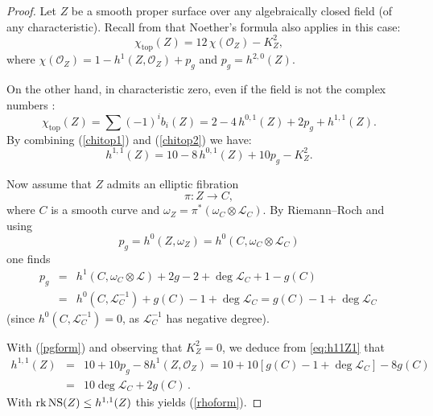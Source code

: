\documentclass[11pt]{amsart}
\theoremstyle{definition}
\theoremstyle{definition}
\theoremstyle{remark}
\theoremstyle{remark}
\theoremstyle{definition}
\theoremstyle{conjecture}
\begin{document}
\begin{proof}Let $Z$ be a smooth proper surface over any algebraically closed field (of any characteristic).  Recall from  \cite{PieneNoether} that Noether’s formula also applies in this case:
\begin{equation} \label{chitop1}
    \chi_{\mathrm{top}}(Z)=12\,\chi(\mathcal O_Z)-K_Z^2,
\end{equation}
where $
\chi(\mathcal O_Z)=1-h^1(Z,\mathcal O_Z) +p_g$ and
$p_g=h^{2,0}(Z)$.

On the other hand, in characteristic zero, even if the field is not the complex numbers \cite[Theorem 5.5]{Deligne1968}:
\begin{equation} \label{chitop2}
\chi_{\mathrm{top}}(Z)=\sum (-1)^i b_i (Z)=2-4\,h^{0,1}(Z)+2p_g+h^{1,1}(Z).
\end{equation}
By combining  (\ref{chitop1}) and (\ref{chitop2}) we have:
\begin{equation} \label{eq:h11Z1}
h^{1,1}(Z)=10-8\,h^{0,1}(Z)+10p_g-K_Z^2.
\end{equation}

\medskip

Now assume that $Z$ admits an elliptic fibration
\[
\pi \colon Z \to C,
\]
where $C$ is a smooth curve and $\omega_Z= \pi^*(\omega_C \otimes \mathcal{L}_C)$.
 By Riemann--Roch and using 
\[
p_g = h^0(Z,\omega_Z)=h^0(C,\omega_C \otimes\mathcal{L}_C) 
\] one finds
\begin{eqnarray} \label{pgform}
p_g&=&h^1(C,\omega_C\otimes\mathcal{L})+2g-2+\deg  \mathcal{L}_C + 1-g(C) \nonumber \\ &=& 
 h^0(C,\mathcal{L}^{-1}_C)+g(C)-1+ \deg {\mathcal L}_C   
= g(C)-1+\deg  \mathcal{L}_C \,
\end{eqnarray}
(since $h^0(C,{\mathcal L}_C^{-1})=0$, as ${\mathcal L}_C^{-1}$ has
negative degree).

{With (\ref{pgform}) and observing that $K_Z^2 =0$, we deduce from \eqref{eq:h11Z1} that}
\begin{eqnarray}
h^{1,1}(Z)
&=&10+10p_g-8h^1(Z,\mathcal O_Z)
=10+10[g(C)-1+ \deg {\mathcal L}_C  ]-8g(C) \nonumber \\
&=&10  \deg {\mathcal L}_C  +2g(C) \,. \nonumber
\end{eqnarray}
With $\mathrm{rk}\, {\rm NS}(Z) \leq h^{1,1}(Z)$ this yields (\ref{rhoform}). \end{proof}
\smallskip
\end{document}
